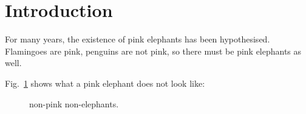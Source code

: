 \section{Introduction}
\label{sec:Introduction}
For many years, the existence of pink elephants has been hypothesised. Flamingoes are pink, penguins are not pink, so there must be pink elephants as well.

Fig.~\ref{NotAPinkElephant} shows what a pink elephant does not look like:
\begin{figure}[h]
\begin{center}
	\caption{non-pink non-elephants.}
	\label{NotAPinkElephant}
\end{center}
\end{figure} 
